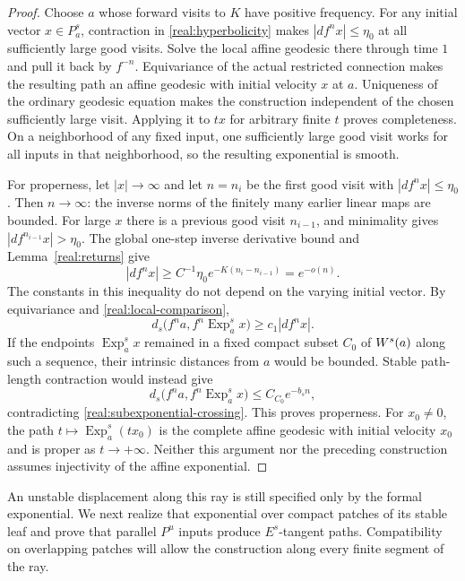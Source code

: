 \begin{proof}
Choose $a$ whose forward visits to $K$ have positive frequency.
For any initial vector $x\in P^s_a$, contraction in
\eqref{real:hyperbolicity} makes $|df^n x|\le\eta_0$ at all
sufficiently large good visits. Solve the local affine geodesic
there through time $1$ and pull it back by $f^{-n}$. Equivariance
of the actual restricted connection makes the resulting path an
affine geodesic with initial velocity $x$ at $a$. Uniqueness of
the ordinary geodesic equation makes the construction independent
of the chosen sufficiently large visit. Applying it to $tx$ for
arbitrary finite $t$ proves completeness. On a neighborhood of
any fixed input, one sufficiently large good visit works for all
inputs in that neighborhood, so the resulting exponential is
smooth.

For properness, let $|x|\to\infty$ and let $n=n_i$ be the first
good visit with $|df^n x|\le\eta_0$. Then $n\to\infty$:
the inverse norms of the finitely many earlier linear maps are
bounded. For large $x$ there is a previous good visit $n_{i-1}$,
and minimality gives $|df^{n_{i-1}}x|>\eta_0$. The global
one-step inverse derivative bound and
Lemma~\ref{real:returns} give
\begin{equation}\label{real:subexponential-crossing}
 |df^n x|
    \ge C^{-1}\eta_0 e^{-K(n_i-n_{i-1})}
    =e^{-o(n)}.
\end{equation}
The constants in this inequality do not depend on the varying
initial vector. By equivariance and
\eqref{real:local-comparison},
\[
 d_s\bigl(f^na,f^n\operatorname{Exp}^s_a x\bigr)
       \ge c_1 |df^n x|.
\]
If the endpoints $\operatorname{Exp}^s_a x$ remained in a fixed
compact subset $C_0$ of $W^s(a)$ along such a sequence, their
intrinsic distances from $a$ would be bounded. Stable path-length
contraction would instead give
\[
 d_s\bigl(f^na,f^n\operatorname{Exp}^s_a x\bigr)
       \le C_{C_0}e^{-b_sn},
\]
contradicting \eqref{real:subexponential-crossing}. This proves
properness. For $x_0\ne0$, the path
$t\mapsto\operatorname{Exp}^s_a(tx_0)$ is the complete affine
geodesic with initial velocity $x_0$ and is proper as
$t\to+\infty$. Neither this argument nor the preceding
construction assumes injectivity of the affine exponential.
\end{proof}

An unstable displacement along this ray is still specified only by the
formal exponential. We next realize that exponential over compact
patches of its stable leaf and prove that parallel $P^u$ inputs produce
$E^s$-tangent paths. Compatibility on overlapping patches will allow the
construction along every finite segment of the ray.

